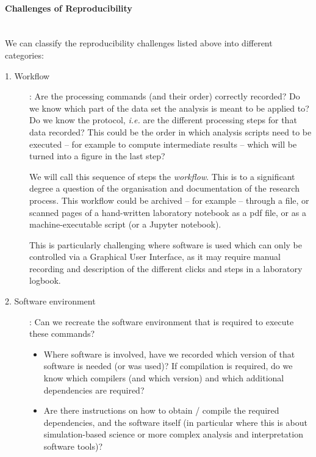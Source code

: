 
\paragraph*{Challenges of Reproducibility}\label{sec:reproducibility-challenges}

\mbox{}\\

We can classify the reproducibility challenges listed above into different categories:

\begin{description}
\item[1. Workflow]: Are the processing commands (and their order)
correctly recorded? Do we know which part of the data set the analysis is meant to be applied to? Do we know the protocol, \emph{i.e.} are the different processing steps for that data recorded? This could be the order in which analysis scripts need to be executed -- for example to compute intermediate results -- which will be turned into a figure in the last step?

We will call this sequence of steps the \emph{workflow}. This is to a significant degree a question of the organisation and documentation of the research process. This workflow could be archived -- for example -- through a  file, or scanned pages of a hand-written laboratory notebook as a pdf file, or as a
machine-executable script (or a Jupyter notebook).

This is particularly challenging where software is used which can only be
controlled via a Graphical User Interface, as it may require manual recording
and description of the different clicks and steps in a laboratory logbook.

\item[2. Software environment]: Can we recreate the software environment that is required to execute these commands?
\begin{itemize}
\item Where software is involved, have we recorded which version of that software is needed (or was used)? If compilation is required, do we know which compilers (and which version) and which additional dependencies are required?
\item Are there instructions on how to obtain / compile the required dependencies,
and the software itself (in particular where this is about simulation-based
science or more complex analysis and interpretation software tools)?
\end{itemize}


\end{description}
